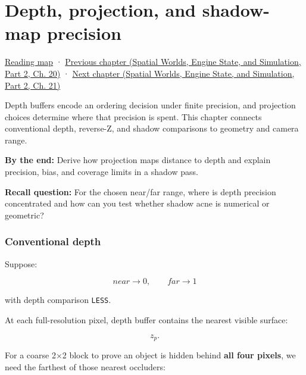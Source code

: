\chapter{Depth, projection, and shadow-map precision}\label{06-engine-ii-ch030-depth-projection-and-shadow-map-precision}\hypertarget{06-engine-ii-ch030}{}\label{stagechapter:06-engine-ii-ch030}

\hypertarget{06-engine-ii-ch030-depth-projection-and-shadow-map-precision}{}

\hyperref[volume-reading-map]{Reading map} · \href{../05-Spatial-Worlds-Engine-State-and-Simulation-P02/main.pdf\#nameddest=06-engine-ii-ch029-dynamic-spatial-indices-for-moving-worlds}{Previous chapter (Spatial Worlds, Engine State, and Simulation, Part 2, Ch. 20)} · \href{../05-Spatial-Worlds-Engine-State-and-Simulation-P02/main.pdf\#nameddest=06-engine-ii-ch031-spatial-index-serialization-and-query-evidence}{Next chapter (Spatial Worlds, Engine State, and Simulation, Part 2, Ch. 21)}

Depth buffers encode an ordering decision under finite precision, and projection choices determine where that precision is spent. This chapter connects conventional depth, reverse-Z, and shadow comparisons to geometry and camera range.

\textbf{By the end:} Derive how projection maps distance to depth and explain precision, bias, and coverage limits in a shadow pass.

\textbf{Recall question:} For the chosen near/far range, where is depth precision concentrated and how can you test whether shadow acne is numerical or geometric?

\subsection{Conventional depth}\label{06-engine-ii-ch030-conventional-depth}

\hypertarget{06-engine-ii-ch030-conventional-depth}{}

Suppose:

\[
near\rightarrow0,
\qquad
far\rightarrow1
\]

with depth comparison \texttt{LESS}.

At each full-resolution pixel, depth buffer contains the nearest visible surface:

\[
z_p.
\]

For a coarse 2×2 block to prove an object is hidden behind \textbf{all four pixels}, we need the farthest of those nearest occluders:

